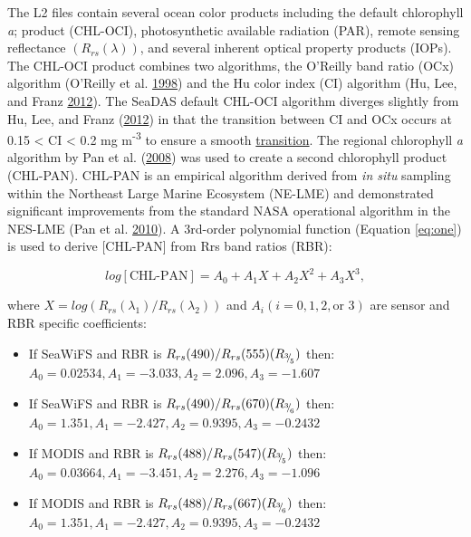 \documentclass[
]{book}
\providecommand{\tightlist}{%
  \setlength{\itemsep}{0pt}\setlength{\parskip}{0pt}}
\begin{document}
The L2 files contain several ocean color products including the default chlorophyll \emph{a}; product (CHL-OCI), photosynthetic available radiation (PAR), remote sensing reflectance \((R_{rs}(\lambda))\), and several inherent optical property products (IOPs). The CHL-OCI product combines two algorithms, the O'Reilly band ratio (OCx) algorithm (O'Reilly et al. \protect\hyperlink{ref-SOE11}{1998}) and the Hu color index (CI) algorithm (Hu, Lee, and Franz \protect\hyperlink{ref-SOE5}{2012}). The SeaDAS default CHL-OCI algorithm diverges slightly from Hu, Lee, and Franz (\protect\hyperlink{ref-SOE5}{2012}) in that the transition between CI and OCx occurs at 0.15 \textless{} CI \textless{} 0.2 mg m\textsuperscript{-3} to ensure a smooth \href{https://oceancolor.gsfc.nasa.gov/atbd/chlor_a/}{transition}. The regional chlorophyll \emph{a} algorithm by Pan et al. (\protect\hyperlink{ref-SOE12}{2008}) was used to create a second chlorophyll product (CHL-PAN). CHL-PAN is an empirical algorithm derived from \emph{in situ} sampling within the Northeast Large Marine Ecosystem (NE-LME) and demonstrated significant improvements from the standard NASA operational algorithm in the NES-LME (Pan et al. \protect\hyperlink{ref-SOE13}{2010}). A 3rd-order polynomial function (Equation \eqref{eq:one}) is used to derive {[}CHL-PAN{]} from Rrs band ratios (RBR):

\begin{equation}
log[\textrm{CHL-PAN}] = A_{0} + A_{1}X + A_{2}X^{2} + A_{3}X^{3},  
\label{eq:one} 
\end{equation}

where \(X = log(R_{rs}(\lambda_{1})/R_{rs}(\lambda_{2}))\) and \(A_{i} (i = 0, 1, 2, \textrm{or } 3)\) are sensor and RBR specific coefficients:

\begin{itemize}
\tightlist
\item
  If SeaWiFS and RBR is \(R_{rs}(490)/R_{rs}(555)(R_{^3{\mskip -5mu/\mskip -3mu}_5})\) then: \(A_0=0.02534, A_1=-3.033, A_2=2.096, A_3=-1.607\)
\item
  If SeaWiFS and RBR is \(R_{rs}(490)/R_{rs}(670)(R_{^3{\mskip -5mu/\mskip -3mu}_6})\) then: \(A_0=1.351, A_1=-2.427, A_2=0.9395, A_3=-0.2432\)
\item
  If MODIS and RBR is \(R_{rs}(488)/R_{rs}(547)(R_{^3{\mskip -5mu/\mskip -3mu}_5})\) then: \(A_0=0. 03664, A_1=-3.451, A_2=2.276, A_3=-1.096\)
\item
  If MODIS and RBR is \(R_{rs}(488)/R_{rs}(667)(R_{^3{\mskip -5mu/\mskip -3mu}_6})\) then: \(A_0=1.351, A_1=-2.427, A_2=0.9395, A_3=-0.2432\)
\end{itemize}
\end{document}

